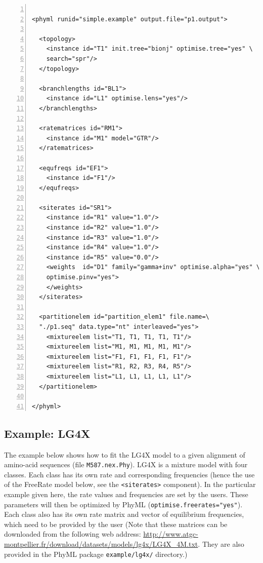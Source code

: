 \documentclass[a4paper,12pt]{article}
\newcommand{\x}[1]{\texttt{#1}}
\begin{document}
\vspace{0.2cm}
\begin{Verbatim}[frame=single, label=Simple PhyML XML example, samepage=true, baselinestretch=0.5,
  fontsize=\small, numbers=left]

<phyml runid="simple.example" output.file="p1.output">

  <topology>
    <instance id="T1" init.tree="bionj" optimise.tree="yes" \
    search="spr"/>
  </topology>

  <branchlengths id="BL1">
    <instance id="L1" optimise.lens="yes"/>
  </branchlengths>

  <ratematrices id="RM1">
    <instance id="M1" model="GTR"/>
  </ratematrices>

  <equfreqs id="EF1">
    <instance id="F1"/>
  </equfreqs>

  <siterates id="SR1">
    <instance id="R1" value="1.0"/>
    <instance id="R2" value="1.0"/>
    <instance id="R3" value="1.0"/>
    <instance id="R4" value="1.0"/>
    <instance id="R5" value="0.0"/>
    <weights  id="D1" family="gamma+inv" optimise.alpha="yes" \
    optimise.pinv="yes">
    </weights>
  </siterates>

  <partitionelem id="partition_elem1" file.name=\
  "./p1.seq" data.type="nt" interleaved="yes">
    <mixtureelem list="T1, T1, T1, T1, T1"/>
    <mixtureelem list="M1, M1, M1, M1, M1"/>
    <mixtureelem list="F1, F1, F1, F1, F1"/>
    <mixtureelem list="R1, R2, R3, R4, R5"/>
    <mixtureelem list="L1, L1, L1, L1, L1"/>
  </partitionelem>

</phyml>

\end{Verbatim}


\subsection{Example: LG4X}

The example below shows how to fit the LG4X model \cite{lg4x} to a given alignment of amino-acid
sequences (file \x{M587.nex.Phy}). LG4X is a mixture model with four classes. Each class has its own
rate and corresponding frequencies (hence the use of the FreeRate model below, see the
\x{<siterates>} component). In the particular example given here, the rate values and frequencies
are set by the users. These parameters will then be optimized by PhyML (\x{optimise.freerates="yes"}).
Each class also has its own rate matrix and vector of equilibrium frequencies, which need to be provided by
the user (Note that these matrices can be downloaded from the following web address:
\url{http://www.atgc-montpellier.fr/download/datasets/models/lg4x/LG4X_4M.txt}. They are also
provided in the PhyML package \x{example/lg4x/} directory.)
\end{document}

